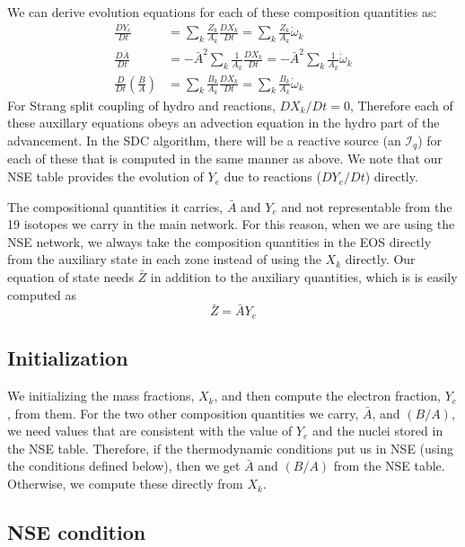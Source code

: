 \documentclass[times,modern]{aastex63}
\newcommand{\omegadot}{\dot{\omega}}
\newcommand{\Ic}{{\boldsymbol{\mathcal{I}}}}
\begin{document}
We can derive evolution equations for each of these composition quantities as:
\begin{align}
\frac{DY_e}{Dt} &= \sum_k \frac{Z_k}{A_k} \frac{DX_k}{Dt} = \sum_k \frac{Z_k}{A_k} \omegadot_k \\
\frac{D\bar{A}}{Dt} &= -\bar{A}^2 \sum_k \frac{1}{A_k} \frac{DX_k}{Dt} = -\bar{A}^2 \sum_k \frac{1}{A_k} \omegadot_k \\
\frac{D}{Dt} \left (\frac{B}{A} \right ) &= \sum_k \frac{B_k}{A_k} \frac{DX_k}{Dt} = \sum_k \frac{B_k}{A_k} \omegadot_k
\end{align}
For Strang split coupling of hydro and reactions, $DX_k/Dt = 0$,
Therefore each of these auxillary equations obeys an advection
equation in the hydro part of the advancement.  In the SDC algorithm,
there will be a reactive source (an $\Ic_q$) for each of these that is
computed in the same manner as above.  We note that our NSE table
provides the evolution of $Y_e$ due to reactions ($DY_e/Dt$) directly.

The compositional quantities
it carries, $\bar{A}$ and $Y_e$ and not representable from the 19
isotopes we carry in the main network. For this reason, when we are
using the NSE network, we always take the composition quantities in
the EOS directly from the auxiliary state in each zone instead of
using the $X_k$ directly. Our equation of state needs $\bar{Z}$ in addition
to the auxiliary quantities, which is is easily computed as
\begin{equation}
\bar{Z} = \bar{A} Y_e
\end{equation}

\subsection{Initialization}

We initializing the mass fractions, $X_k$, and then compute the
electron fraction, $Y_e$, from them.  For the two other composition
quantities we carry, $\bar{A}$, and $(B/A)$, we need values that are
consistent with the value of $Y_e$ and the nuclei stored in the NSE
table.  Therefore, if the thermodynamic conditions put us in NSE
(using the conditions defined below), then we get $\bar{A}$ and
$(B/A)$ from the NSE table.  Otherwise, we compute these directly from
$X_k$. 

\subsection{NSE condition}
\end{document}
